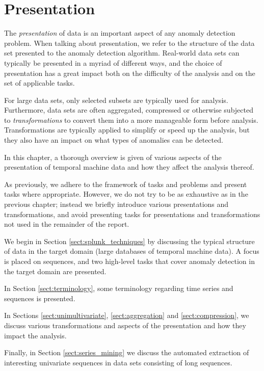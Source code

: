 \chapter{Presentation}
\label{ch:transformations}

The \emph{presentation} of data is an important aspect of any anomaly detection problem. When talking about presentation, we refer to the structure of the data set presented to the anomaly detection algorithm. Real-world data sets can typically be presented in a myriad of different ways, and the choice of presentation has a great impact both on the difficulty of the analysis and on the set of applicable tasks.

For large data sets, only selected subsets are typically used for analysis. Furthermore, data sets are often aggregated, compressed or otherwise subjected to \emph{transformations} to convert them into a more manageable form before analysis. Transformations are typically applied to simplify or speed up the analysis, but they also have an impact on what types of anomalies can be detected.

In this chapter, a thorough overview is given of various aspects of the presentation of temporal machine data and how they affect the analysis thereof.

As previously, we adhere to the framework of tasks and problems and present tasks where appropriate. However, we do not try to be as exhaustive as in the previous chapter; instead we briefly introduce various presentations and transformations, and avoid presenting tasks for presentations and transformations not used in the remainder of the report.

We begin in Section \ref{sect:splunk_techniques} by discussing the typical structure of data in the target domain (large databases of temporal machine data). A focus is placed on sequences, and two high-level tasks that cover anomaly detection in the target domain are presented.

In Section \ref{sect:terminology}, some terminology regarding time series and sequences is presented.

In Sections \ref{sect:unimultivariate}, \ref{sect:aggregation} and \ref{sect:compression}, we discuss various transformations and aspects of the presentation and how they impact the analysis.

Finally, in Section \ref{sect:series_mining} we discuss the automated extraction of interesting univariate sequences in data sets consisting of long sequences. 

